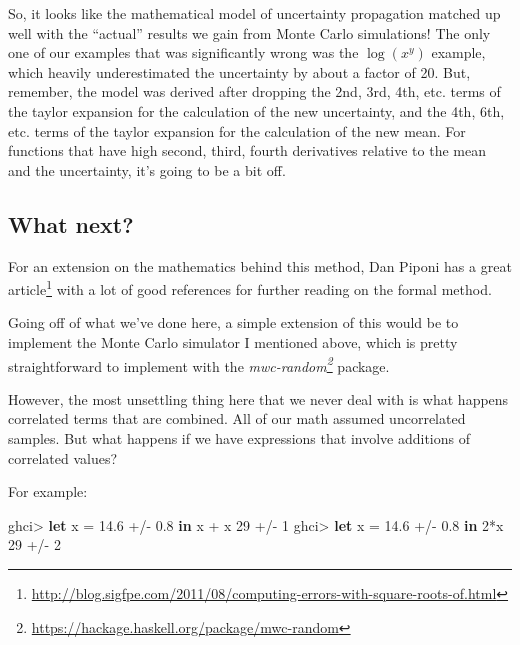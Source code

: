 \documentclass[]{article}
\newenvironment{Shaded}{}{}
\newcommand{\KeywordTok}[1]{\textcolor[rgb]{0.00,0.44,0.13}{\textbf{{#1}}}}
\newcommand{\DecValTok}[1]{\textcolor[rgb]{0.25,0.63,0.44}{{#1}}}
\newcommand{\FloatTok}[1]{\textcolor[rgb]{0.25,0.63,0.44}{{#1}}}
\newcommand{\FunctionTok}[1]{\textcolor[rgb]{0.02,0.16,0.49}{{#1}}}
\newcommand{\NormalTok}[1]{{#1}}
\renewcommand{\href}[2]{#2\footnote{\url{#1}}}
\begin{document}
So, it looks like the mathematical model of uncertainty propagation matched up
well with the ``actual'' results we gain from Monte Carlo simulations! The only
one of our examples that was significantly wrong was the
\(\operatorname{log}(x^y)\) example, which heavily underestimated the
uncertainty by about a factor of 20. But, remember, the model was derived after
dropping the 2nd, 3rd, 4th, etc. terms of the taylor expansion for the
calculation of the new uncertainty, and the 4th, 6th, etc. terms of the taylor
expansion for the calculation of the new mean. For functions that have high
second, third, fourth derivatives relative to the mean and the uncertainty, it's
going to be a bit off.

\subsection{What next?}\label{what-next}

For an extension on the mathematics behind this method, Dan Piponi has a
\href{http://blog.sigfpe.com/2011/08/computing-errors-with-square-roots-of.html}{great
article} with a lot of good references for further reading on the formal method.

Going off of what we've done here, a simple extension of this would be to
implement the Monte Carlo simulator I mentioned above, which is pretty
straightforward to implement with the
\emph{\href{https://hackage.haskell.org/package/mwc-random}{mwc-random}}
package.

However, the most unsettling thing here that we never deal with is what happens
correlated terms that are combined. All of our math assumed uncorrelated
samples. But what happens if we have expressions that involve additions of
correlated values?

For example:

\begin{Shaded}
\begin{Highlighting}[]
\NormalTok{ghci}\FunctionTok{>} \KeywordTok{let} \NormalTok{x }\FunctionTok{=} \FloatTok{14.6} \FunctionTok{+/-} \FloatTok{0.8} \KeywordTok{in} \NormalTok{x }\FunctionTok{+} \NormalTok{x}
\DecValTok{29} \FunctionTok{+/-} \DecValTok{1}
\NormalTok{ghci}\FunctionTok{>} \KeywordTok{let} \NormalTok{x }\FunctionTok{=} \FloatTok{14.6} \FunctionTok{+/-} \FloatTok{0.8} \KeywordTok{in} \DecValTok{2}\FunctionTok{*}\NormalTok{x}
\DecValTok{29} \FunctionTok{+/-} \DecValTok{2}
\end{Highlighting}
\end{Shaded}
\end{document}
